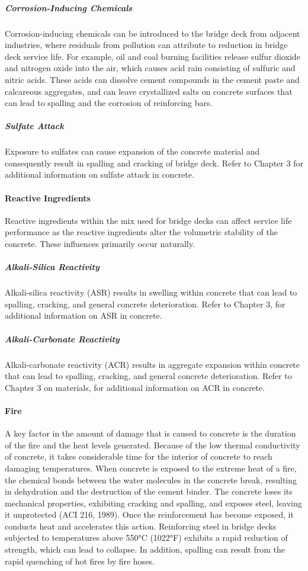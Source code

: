 \subparagraph*{Corrosion-Inducing Chemicals}
Corrosion-inducing chemicals can be introduced to the bridge deck from
adjacent industries, where residuals from pollution can attribute to reduction in bridge deck service life. For example,
oil and coal burning facilities release sulfur dioxide and nitrogen oxide into the air, which causes acid rain consisting
of sulfuric and nitric acids. These acids can dissolve cement compounds in the cement paste and calcareous
aggregates, and can leave crystallized salts on concrete surfaces that can lead to spalling and the corrosion of
reinforcing bars.
\subparagraph*{Sulfate Attack}
Exposure to sulfates can cause expansion of the concrete material and consequently result in
spalling and cracking of bridge deck. Refer to Chapter 3 for additional information on sulfate attack in concrete.

\paragraph{Reactive Ingredients}
Reactive ingredients within the mix used for bridge decks can affect service life performance as the reactive
ingredients alter the volumetric stability of the concrete. These influences primarily occur naturally.
\subparagraph*{Alkali-Silica Reactivity}
Alkali-silica reactivity (ASR) results in swelling within concrete that can lead to spalling, cracking, and general concrete deterioration. Refer to Chapter 3, for additional information on ASR in concrete.

\subparagraph*{Alkali-Carbonate Reactivity}
Alkali-carbonate reactivity (ACR) results in aggregate expansion within concrete that can lead to spalling, cracking, and general concrete deterioration. Refer to Chapter 3 on materials, for additional information on ACR in concrete.

\paragraph{Fire}
A key factor in the amount of damage that is caused to concrete is the duration of the fire and the heat levels
generated. Because of the low thermal conductivity of concrete, it takes considerable time for the interior of concrete
to reach damaging temperatures. When concrete is exposed to the extreme heat of a fire, the chemical bonds between
the water molecules in the concrete break, resulting in dehydration and the destruction of the cement binder. The
concrete loses its mechanical properties, exhibiting cracking and spalling, and exposes steel, leaving it unprotected (ACI 216, 1989). Once the reinforcement has become exposed, it conducts heat and accelerates this action.
Reinforcing steel in bridge decks subjected to temperatures above 550°C (1022°F) exhibits a rapid reduction of
strength, which can lead to collapse. In addition, spalling can result from the rapid quenching of hot fires by fire
hoses.

